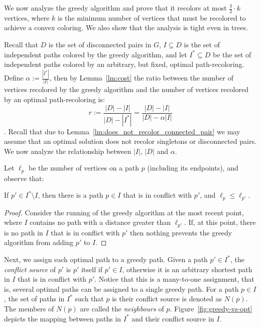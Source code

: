 

We now analyze the greedy algorithm and prove that it recolors at most 
$\frac{3}{2} \cdot k$ vertices, 
where $k$ is the minimum number of vertices that must be recolored to achieve a convex
coloring.
%
We also show that the analysis is tight even in trees.

Recall that $D$ is the set of disconnected pairs in $G$, 
$I \subseteq D$ is the set of independent paths colored by the greedy algorithm, 
and let $I^* \subseteq D$ be the set of independent paths colored by an arbitrary, 
but fixed,
optimal path-recoloring.  
%
Define $\alpha := \frac{|I^*|}{|I|}$,
then by Lemma~\ref{lm:cost} the ratio between the number of 
vertices recolored by the greedy algorithm and the number of vertices
recolored by an optimal path-recoloring is:
\[
r := \frac{|D| - |I|}{|D| - |I^*|}
= \frac{|D| - |I|}{|D| - \alpha |I|}
\].
Recall that due to Lemma~\ref{lm:does_not_recolor_connected_pair} we
may assume that an optimal solution does not recolor singletons or
disconnected pairs.
%
We now analyze the relationship between $|I|$, $|D|$ and $\alpha$.

Let $\ell_p$ be the number of vertices on a path $p$ (including its endpoints), 
and observe that:

\begin{lemma}
\label{lemma:assign}
If $p' \in I^* \setminus I$, then there is a path $p \in I$ that is in
conflict with $p'$, and $\ell_p \leq \ell_{p'}$.
\end{lemma}
\begin{proof}
Consider the running of the greedy algorithm at the most recent point,
where $I$ contains no path with a distance greater than $\ell_{p'}$.  If,
at this point, there is no path in $I$ that is in conflict with $p'$
then nothing prevents the greedy algorithm from adding $p'$ to $I$.
{}\end{proof}

Next, we assign each optimal path to a greedy path.
%
Given a path $p' \in I^*$, the \emph{conflict source} of $p'$ is $p'$
itself if $p' \in I$, otherwise it is an arbitrary shortest path in
$I$ that is in conflict with $p'$.
%
Notice that this is a many-to-one assignment, that is, several optimal
paths can be assigned to a single greedy path.
%
For a path $p \in I$, the set of paths in $I^*$ such that $p$ is their
conflict source is denoted as $N(p)$.
The members of $N(p)$ are called the \emph{neighbours} of $p$.
Figure~\ref{fig:greedy-vs-opt} depicts the mapping between paths in 
$I^*$ and their conflict source in $I$.

